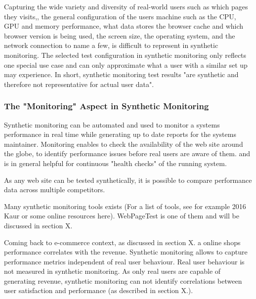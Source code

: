 Capturing the wide variety and diversity of real-world users such as which pages they visits,, the general configuration of the users machine such as the CPU, GPU and memory performance, what data stores the browser cache and which browser version is being used, the screen size, the operating system, and the network connection to name a few, is difficult to represent in synthetic monitoring. %
The selected test configuration in synthetic monitoring only reflects one special use case and can only approximate what a user with a similar set up may experience. %
In short, synthetic monitoring test results "are synthetic and therefore not representative for actual user data".  %



\subsubsection{The "Monitoring" Aspect in Synthetic Monitoring}


Synthetic monitoring can be automated and used to monitor a systems performance in real time while generating up to date reports for the systems maintainer. %
Monitoring enables to check the availability of the web site around the globe, %
to identify performance issues before real users are aware of them. %
and is in general helpful for continuous "health checks" of the running system. %

As any web site can be tested synthetically, it is possible to compare performance data across multiple competitors. %



Many synthetic monitoring tools exists (For a list of tools, see for example 2016 Kaur or some online resources here).
WebPageTest is one of them and will be discussed in section X.



Coming back to e-commerce context, as discussed in section X.  a online shops performance correlates with the revenue.
Synthetic monitoring allows to capture performance metrics independent of real user behaviour.
Real user behaviour is not measured in synthetic monitoring.
As only real users are capable of generating revenue, synthetic monitoring can not identify correlations between user satisfaction and performance (as described in section X.).%

